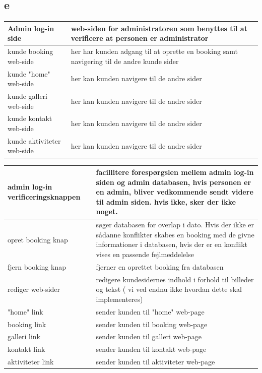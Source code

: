 \documentclass[12pt,a4paper]{article}
\begin{document}
\subsection{e}

\begin{minipage}{\textwidth}

 \label{tab:title}
\begin{tabular}{| p{5cm} | p{10cm} |}
\hline Admin log-in side & web-siden for administratoren som benyttes til at verificere at personen er administrator \\
\hline kunde booking web-side & her har kunden adgang til at oprette en booking samt navigering til de andre kunde sider \\
\hline kunde "home" web-side & her kan kunden navigere til de andre sider \\
\hline kunde galleri web-side & her kan kunden navigere til de andre sider \\
\hline kunde kontakt web-side & her kan kunden navigere til de andre sider \\
\hline kunde aktiviteter web-side & her kan kunden navigere til de andre sider \\
\hline
\end{tabular}

\end{minipage}

\bigskip

\begin{minipage}{\textwidth}

 \label{tab:title}
\begin{tabular}{| p{5cm} | p{10cm} |}
\hline admin log-in \newline verificeringsknappen & facillitere forespørgslen mellem admin log-in siden og admin databasen, hvis personen er en admin, bliver vedkommende sendt videre til admin siden. hvis ikke, sker der ikke noget.\\
\hline opret booking knap & søger databasen for overlap i dato. Hvis der ikke er sådanne konflikter skabes en booking med de givne informationer i databasen, hvis der er en konflikt vises en passende fejlmeddelelse \\
\hline fjern booking knap & fjerner en oprettet booking fra databasen \\
\hline rediger web-sider & redigere kundesidernes indhold i forhold til billeder og tekst ( vi ved endnu ikke hvordan dette skal implementeres) \\
\hline "home" link & sender kunden til "home" web-page \\
\hline booking link & sender kunden til booking web-page \\
\hline galleri link & sender kunden til galleri web-page \\
\hline kontakt link & sender kunden til kontakt web-page \\
\hline aktiviteter link & sender kunden til aktiviteter web-page \\
\hline
\end{tabular}

\end{minipage}
\end{document}
